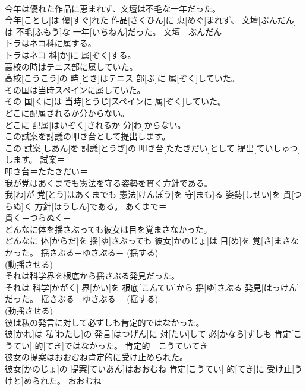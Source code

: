 \documentclass[8pt]{extreport}
\begin{document}
\begin{CJK}{UTF8}{min}
\\	今年は優れた作品に恵まれず、文壇は不毛な一年だった。	
\\	今年[ことし]は 優[すぐ]れた 作品[さくひん]に 恵[めぐ]まれず、 文壇[ぶんだん]は 不毛[ふもう]な 一年[いちねん]だった。	文壇＝ぶんだん＝ 
\\	トラはネコ科に属する。	
\\	トラはネコ 科[か]に 属[ぞく]する。	
\\	高校の時はテニス部に属していた。	
\\	高校[こうこう]の 時[とき]はテニス 部[ぶ]に 属[ぞく]していた。	
\\	その国は当時スペインに属していた。	
\\	その 国[くに]は 当時[とうじ]スペインに 属[ぞく]していた。	
\\	どこに配属されるか分からない。	
\\	どこに 配属[はいぞく]されるか 分[わ]からない。	
\\	この試案を討議の叩き台として提出します。	
\\	この 試案[しあん]を 討議[とうぎ]の 叩き台[たたきだい]として 提出[ていしゅつ]します。	試案＝ 
\\	叩き台＝たたきだい＝ 
\\	我が党はあくまでも憲法を守る姿勢を貫く方針である。	
\\	我[わ]が 党[とう]はあくまでも 憲法[けんぽう]を 守[まも]る 姿勢[しせい]を 貫[つらぬ]く 方針[ほうしん]である。	あくまで＝ 
\\	貫く＝つらぬく＝ 
\\	どんなに体を揺さぶっても彼女は目を覚まさなかった。	
\\	どんなに 体[からだ]を 揺[ゆ]さぶっても 彼女[かのじょ]は 目[め]を 覚[さ]まさなかった。	揺さぶる＝ゆさぶる＝ (揺する) 
\\	(動揺させる) 
\\	それは科学界を根底から揺さぶる発見だった。	
\\	それは 科学[かがく] 界[かい]を 根底[こんてい]から 揺[ゆ]さぶる 発見[はっけん]だった。	揺さぶる＝ゆさぶる＝ (揺する) 
\\	(動揺させる) 
\\	彼は私の発言に対して必ずしも肯定的ではなかった。	
\\	彼[かれ]は 私[わたし]の 発言[はつげん]に 対[たい]して 必[かなら]ずしも 肯定[こうてい] 的[てき]ではなかった。	肯定的＝こうていてき＝ 
\\	彼女の提案はおおむね肯定的に受け止められた。	
\\	彼女[かのじょ]の 提案[ていあん]はおおむね 肯定[こうてい] 的[てき]に 受け止[うけと]められた。	おおむね＝ 

\end{CJK}
\end{document}
